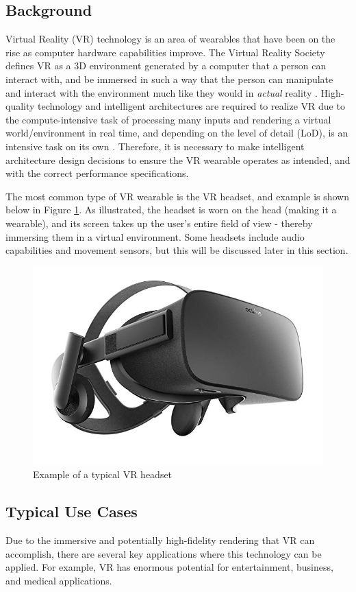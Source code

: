 \subsection{Background}
Virtual Reality (VR) technology is an area of wearables that have been on the rise
as computer hardware capabilities improve. The Virtual Reality Society defines VR as
a 3D environment generated by a computer that a person can interact with, and be
immersed in such a way that the person can manipulate and interact with the environment
much like they would in \textit{actual} reality \cite{vr_soc_defn}. High-quality
technology and intelligent architectures are required to realize VR due to
the compute-intensive task of processing many inputs and rendering a virtual
world/environment in real time, and depending on the level of detail (LoD), is
an intensive task on its own \cite{hickey_wt4_pres}. Therefore, it is necessary
to make intelligent architecture design decisions to ensure the VR wearable operates
as intended, and with the correct performance specifications.

The most common type of VR wearable is the VR headset, and example is shown below in
Figure \ref{vr:example}. As illustrated, the headset is worn on the head (making it
a wearable), and its screen takes up the user's entire field of view - thereby immersing
them in a virtual environment. Some headsets include audio capabilities and movement
sensors, but this will be discussed later in this section.


\begin{figure}[h]
    \centering
    \includegraphics[width=.3\linewidth]{media/vr_headset_example.jpg}
    \caption{Example of a typical VR headset \cite{vr_headset_pic}}
    \label{vr:example}
\end{figure}

\subsection{Typical Use Cases}
Due to the immersive and potentially high-fidelity rendering that VR can accomplish,
there are several key applications where this technology can be applied. For example, 
VR has enormous potential for entertainment, business, and medical applications.

